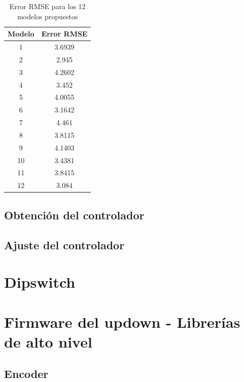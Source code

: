 \begin{table}[!ht]
	\begin{center}
		
		\begin{tabular}{|c|c|}
			\hline
			\rowcolor{OODlightblue}
			Modelo & Error RMSE   \\
			\hline \hline
			1 & 3.6939 \\
			\hline
			2 & 2.945 \\
			\hline
			3 & 4.2602  \\
			\hline
			4 & 3.452  \\
			\hline
			5 & 4.0055 \\
			\hline
			6 & 3.1642 \\
			\hline
			7 & 4.461 \\
			\hline
			8 & 3.8115 \\
			\hline
			9 & 4.1403 \\
			\hline
			10 & 3.4381 \\
			\hline
			11 & 3.8415 \\
			\hline
			12 & 3.084 \\
			\hline
		\end{tabular}
	\end{center}
	\caption{Error RMSE para los 12 modelos propuestos}
	\label{table:\thetable}
\end{table}


\subsection{Obtención del controlador}

\subsection{Ajuste del controlador}


\section{Dipswitch} \label{sec:\thesection}

\section{Firmware del updown - Librerías de alto nivel} \label{sec:\thesection}

\subsection{Encoder}

